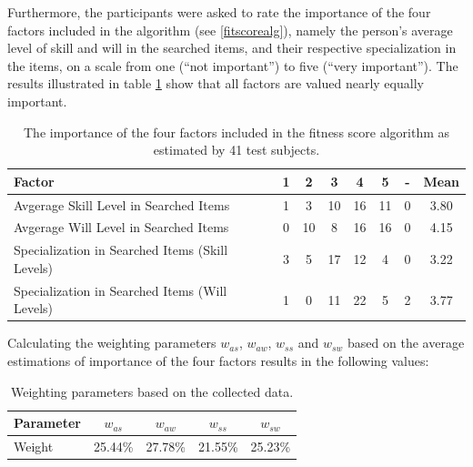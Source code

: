 Furthermore, the participants were asked to rate the importance of the four factors included in the algorithm (see \ref{fitscorealg}), namely the person's average level of skill and will in the searched items, and their respective specialization in the items, on a scale from one (``not important'') to five (``very important''). The results illustrated in table \ref{tab:survey_weight} show that all factors are valued nearly equally important.
\begin{table}[H]
\centering
\begin{tabular}{l||c|c|c|c|c|c||c}
Factor & 1  & 2  & 3  & 4  & 5  & - & Mean \\
\hline
Avgerage Skill Level in Searched Items & 1 & 3 & 10 & 16 & 11 & 0 & 3.80\\
Avgerage Will Level in Searched Items & 0 & 10 & 8 & 16 & 16 & 0 & 4.15\\
Specialization in Searched Items (Skill Levels) & 3 & 5 & 17 & 12 & 4 & 0 & 3.22\\
Specialization in Searched Items (Will Levels) & 1 & 0 & 11 & 22 & 5 & 2 & 3.77\\
\end{tabular}
\caption[Survey: Estimated Importance of Weighting Factors]{The importance of the four factors included in the fitness score algorithm as estimated by 41 test subjects.}
\label{tab:survey_weight}
\end{table}


Calculating the weighting parameters $w_{as}$, $w_{aw}$, $w_{ss}$ and $w_{sw}$ based on the average estimations of importance of the four factors results in the following values:
\begin{table}[H]
\centering
\begin{tabular}{l||c|c|c|c}
Parameter & $w_{as}$ & $w_{aw}$ & $w_{ss}$ & $w_{sw}$\\
\hline
Weight & 25.44\% & 27.78\% & 21.55\% & 25.23\% \\
\end{tabular}
\caption[Survey: Resulting Weighting Parameters]{Weighting parameters based on the collected data.}
\end{table}

\newpage
